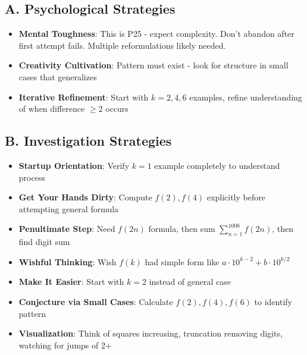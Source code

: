\documentclass[]{article}
\begin{document}
\begin{strategicbox}
\subsection*{A. Psychological Strategies}
\begin{itemize}[leftmargin=*]
    \item \textbf{Mental Toughness}: This is P25 - expect complexity. Don't abandon after first attempt fails. Multiple reformulations likely needed.
    \item \textbf{Creativity Cultivation}: Pattern must exist - look for structure in small cases that generalizes
    \item \textbf{Iterative Refinement}: Start with $k=2,4,6$ examples, refine understanding of when difference $\geq 2$ occurs
\end{itemize}

\subsection*{B. Investigation Strategies}
\begin{itemize}[leftmargin=*]
    \item \textbf{Startup Orientation}: Verify $k=1$ example completely to understand process
    \item \textbf{Get Your Hands Dirty}: Compute $f(2), f(4)$ explicitly before attempting general formula
    \item \textbf{Penultimate Step}: Need $f(2n)$ formula, then sum $\sum_{n=1}^{1008} f(2n)$, then find digit sum
    \item \textbf{Wishful Thinking}: Wish $f(k)$ had simple form like $a \cdot 10^{k-2} + b \cdot 10^{k/2}$
    \item \textbf{Make It Easier}: Start with $k=2$ instead of general case
    \item \textbf{Conjecture via Small Cases}: Calculate $f(2), f(4), f(6)$ to identify pattern
    \item \textbf{Visualization}: Think of squares increasing, truncation removing digits, watching for jumps of 2+
\end{itemize}


\end{strategicbox}
\end{document}
